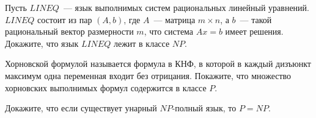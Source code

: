 \breakline

\begin{ptask}{17}
    Пусть $LINEQ$~--- язык выполнимых систем рациональных линейный уравнений. $LINEQ$
    состоит из пар $(A, b)$, где $A$~--- матрица $m \times n$, а $b$~--- такой
    рациональный вектор размерности $m$, что система $Ax = b$ имеет
    решения. Докажите, что язык $LINEQ$ лежит в классе $NP$.
\end{ptask}

\begin{ptask}{20}
    Хорновской формулой называется формула в КНФ, в которой в каждый дизъюнкт
    максимум одна переменная входит без отрицания. Покажите, что множество
    хорновских выполнимых формул содержится в классе $P$.
\end{ptask}

\begin{ptask}{24}
	Докажите, что если существует унарный $NP$-полный язык, то $P = NP$.    
\end{ptask}
